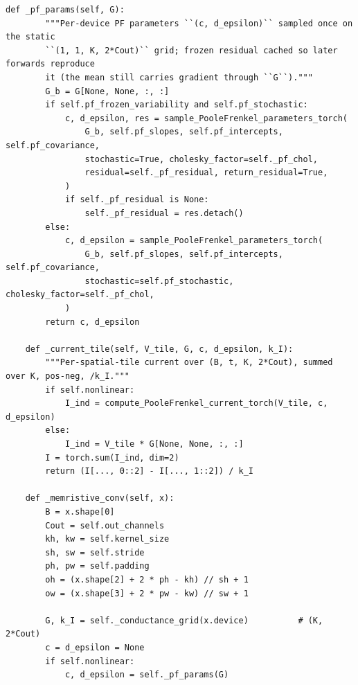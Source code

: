 \begin{lstlisting}[caption={mnn\_torch/layers.py},label={lst:mnn-src-layers}]
    def _pf_params(self, G):
        """Per-device PF parameters ``(c, d_epsilon)`` sampled once on the static
        ``(1, 1, K, 2*Cout)`` grid; frozen residual cached so later forwards reproduce
        it (the mean still carries gradient through ``G``)."""
        G_b = G[None, None, :, :]
        if self.pf_frozen_variability and self.pf_stochastic:
            c, d_epsilon, res = sample_PooleFrenkel_parameters_torch(
                G_b, self.pf_slopes, self.pf_intercepts, self.pf_covariance,
                stochastic=True, cholesky_factor=self._pf_chol,
                residual=self._pf_residual, return_residual=True,
            )
            if self._pf_residual is None:
                self._pf_residual = res.detach()
        else:
            c, d_epsilon = sample_PooleFrenkel_parameters_torch(
                G_b, self.pf_slopes, self.pf_intercepts, self.pf_covariance,
                stochastic=self.pf_stochastic, cholesky_factor=self._pf_chol,
            )
        return c, d_epsilon

    def _current_tile(self, V_tile, G, c, d_epsilon, k_I):
        """Per-spatial-tile current over (B, t, K, 2*Cout), summed over K, pos-neg, /k_I."""
        if self.nonlinear:
            I_ind = compute_PooleFrenkel_current_torch(V_tile, c, d_epsilon)
        else:
            I_ind = V_tile * G[None, None, :, :]
        I = torch.sum(I_ind, dim=2)
        return (I[..., 0::2] - I[..., 1::2]) / k_I

    def _memristive_conv(self, x):
        B = x.shape[0]
        Cout = self.out_channels
        kh, kw = self.kernel_size
        sh, sw = self.stride
        ph, pw = self.padding
        oh = (x.shape[2] + 2 * ph - kh) // sh + 1
        ow = (x.shape[3] + 2 * pw - kw) // sw + 1

        G, k_I = self._conductance_grid(x.device)          # (K, 2*Cout)
        c = d_epsilon = None
        if self.nonlinear:
            c, d_epsilon = self._pf_params(G)


\end{lstlisting}
